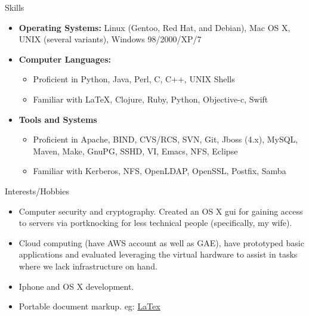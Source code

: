 \documentclass[11pt,oneside]{article}
\newenvironment{ressection}[1]{
        \vspace{4pt}
        {\fontfamily{phv}\selectfont\Large#1}
        \begin{itemize}
        \vspace{3pt}
}{
        \end{itemize}
}
\newcommand{\resitem}[1]{
        \vspace{-4pt}
        \item \begin{flushleft} #1 \end{flushleft}
}
\newcommand{\ressubitem}[1]{
        \vspace{-1pt}
        \item \begin{flushleft} #1 \end{flushleft}
}
\newenvironment{reslist}[1]{
        \resitem{\textbf{#1}}
        \vspace{-5pt}
        \begin{itemize}
}{
        \end{itemize}
}
\begin{document}
\begin{ressection}{Skills}

  \resitem{\textbf{Operating Systems:} Linux (Gentoo, Red Hat, and
    Debian), Mac OS X, UNIX (several variants), Windows 98/2000/XP/7}

  \begin{reslist}{Computer Languages:}

    \ressubitem{Proficient in Python, Java, Perl, C, C++,  UNIX Shells}

    \ressubitem{Familiar with \LaTeX, Clojure, Ruby, Python, Objective-c, Swift}

  \end{reslist}

  \begin{reslist}{Tools and Systems}

    \ressubitem{Proficient in Apache, BIND, CVS/RCS, SVN, Git, Jboss
      (4.x), MySQL, Maven, Make, GnuPG, SSHD, VI, Emacs, NFS, Eclipse}

    \ressubitem{Familiar with Kerberos, NFS, OpenLDAP, OpenSSL, Postfix, Samba}

  \end{reslist}


\end{ressection}


\begin{ressection}{Interests/Hobbies}

  \resitem{Computer security and cryptography. Created an OS X gui for
    gaining access to servers via portknocking for less technical
    people (specifically, my wife).}

  \resitem{Cloud computing (have AWS account as well as GAE), have
    prototyped basic applications and evaluated leveraging the virtual
    hardware to assist in tasks where we lack infrastructure on hand.}

  \resitem{Iphone and OS X development.}

  \resitem{Portable document markup. eg: \href{https://github.com/jstelzer/Resume/blob/master/stelzer-res.tex}{LaTex}}

\end{ressection}
\end{document}
